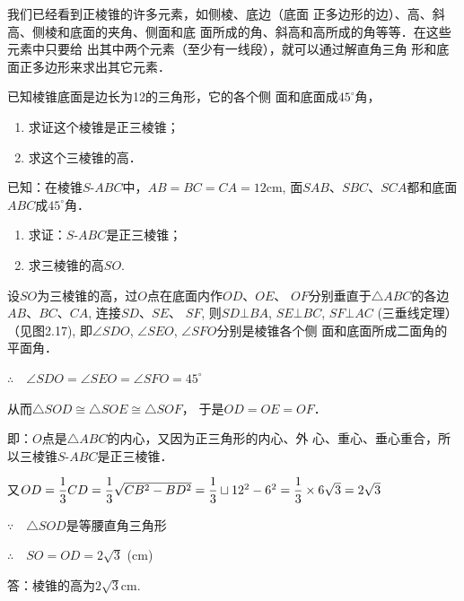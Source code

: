我们已经看到正棱锥的许多元素，如侧棱、底边（底面
正多边形的边）、高、斜高、侧棱和底面的夹角、侧面和底
面所成的角、斜高和高所成的角等等．在这些元素中只要给
出其中两个元素（至少有一线段），就可以通过解直角三角
形和底面正多边形来求出其它元素．

\begin{example}
已知棱锥底面是边长为12的三角形，它的各个侧
面和底面成$45^{\circ}$角，
\begin{enumerate}
    \item 求证这个棱锥是正三棱锥；
    \item 求这个三棱锥的高．
\end{enumerate}

已知：在棱锥$S$-$ABC$中，$AB=BC=CA=12$cm, 
面$SAB$、$SBC$、$SCA$都和底面$ABC$成$45^{\circ}$角．
\begin{enumerate}
    \item 求证：$S$-$ABC$是正三棱锥；
    \item 求三棱锥的高$SO$.
\end{enumerate}
\end{example}

\begin{solution}
    设$SO$为三棱锥的高，过$O$点在底面内作$OD$、$OE$、
$OF$分别垂直于$\triangle ABC$的各边$AB$、$BC$、$CA$, 连接$SD$、$SE$、
$SF$, 则$SD\bot BA$, $SE\bot BC$, $SF\bot AC$ (三垂线定理）（见图2.17), 即$\angle SDO$, $\angle SEO$, $\angle SFO$分别是棱锥各个侧
面和底面所成二面角的平面角．

$\therefore\quad \angle SDO=\angle SEO=\angle SFO=45^{\circ}$

从而$\triangle SOD\cong \triangle SOE\cong \triangle SOF$，
于是$OD=OE=OF$．

即：$O$点是$\triangle ABC$的内心，又因为正三角形的内心、外
心、重心、垂心重合，所以三棱锥$S$-$ABC$是正三棱锥．

又$OD=\dfrac{1}{3}CD=\dfrac{1}{3}\sqrt{CB^2-BD^2}=\dfrac{1}{3}\sqcup12^2-6^2=\dfrac{1}{3}\times 6\sqrt{3}=2\sqrt{3}$

$\because\quad \triangle SOD$是等腰直角三角形

$\therefore\quad SO=OD=2\sqrt{3}$ (cm)

答：棱锥的高为$2\sqrt{3}$cm.
\end{solution}

